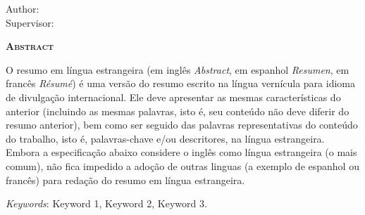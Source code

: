 \begin{center}
	{\Large{\textbf{\myThesisEnglish}}}
\end{center}

\vspace{1cm}

\begin{flushright}
	Author: \myName\\
	Supervisor: \mySupervisorName
\end{flushright}

\vspace{1cm}

\begin{center}
	\Large{\textsc{\textbf{Abstract}}}
\end{center}

\noindent O resumo em língua estrangeira (em inglês \textit{Abstract}, em
espanhol \textit{Resumen}, em francês \textit{Résumé}) é uma versão do resumo
escrito na língua vernícula para idioma de divulgação internacional. Ele deve
apresentar as mesmas características do anterior (incluindo as mesmas palavras,
isto é, seu conteúdo não deve diferir do resumo anterior), bem como ser seguido
das palavras representativas do conteúdo do trabalho, isto é, palavras-chave
e/ou descritores, na língua estrangeira. Embora a especificação abaixo considere
o inglês como língua estrangeira (o mais comum), não fica impedido a adoção de
outras linguas (a exemplo de espanhol ou francês) para redação do resumo em
língua estrangeira.

\noindent\textit{Keywords}: Keyword 1, Keyword 2, Keyword 3.